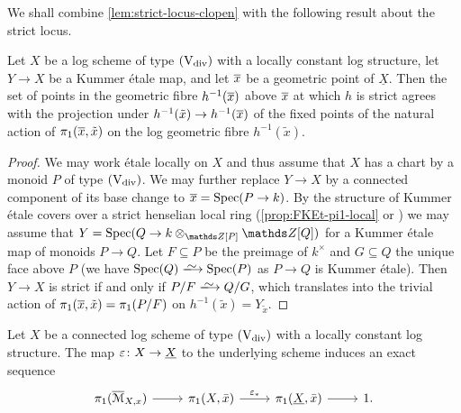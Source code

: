 We shall combine \cref{lem:strict-locus-clopen} with the following result about the strict locus.

\begin{lem} \label{lem:criterion strict}
    Let $X$ be a log scheme of type $(\mathrm{V}_{\rm div})$ with a locally constant log structure, let $Y\to X$ be a Kummer \'etale map, and let $\overline{x}$ be a geometric point of $\underline{X}$.  Then the set of points in the geometric fibre $h^{-1}(\overline{x})$ above $\overline{x}$ at which $h$ is strict agrees with the projection under $h^{-1}(\tilde{x}) \to h^{-1}(\overline{x})$ of the 
    fixed points of the natural action of $\pi_1(\overline{x},\tilde x)$ on the log geometric fibre $h^{-1}(\tilde x)$.
\end{lem}

\begin{proof}
We may work \'etale locally on $X$ and thus assume that $X$ has a chart by a monoid $P$ of type $(\mathrm{V}_{\rm div})$.
We may further replace $Y \to X$ by a connected component of its base change to $\overline{x} = \operatorname{Spec}(P\to k)$. By the structure of Kummer \'etale covers over a strict henselian local ring (\cref{prop:FKEt-pi1-local} or \cite[Lemma~4.2.7]{AHLS-Log}) we may assume that $Y = \Spec(Q\to k\otimes_{\bZ[P]}\bZ[Q])$ for a Kummer \'etale map of monoids $P \to Q$. Let $F \subseteq P$ be the preimage of $k^\times$ and $G\subseteq Q$ the unique face above $P$ (we have $\Spec(Q)\isomto\Spec(P)$ as $P\to Q$ is Kummer \'etale). Then $Y\to X$ is strict if and only if $P/F\isomto Q/G$, which translates into the trivial action of $\pi_1(\overline{x},\tilde{x}) = \pi_1(P/F)$ on $h^{-1}(\tilde x) = Y_{\tilde x}$.
\end{proof}

\begin{prop} \label{prop:torus-fibration-pi1}
    Let $X$ be a connected log scheme of type $(\mathrm{V}_{\rm div})$ with a locally constant log structure. 
    The map $\varepsilon\colon X \to \underline{X}$ to the underlying scheme induces an exact sequence
    \[
        \begin{tikzcd}
            \pi_1(\ov \cM_{X,x}) \ar[r] & \pi_1(X,\bar x) \ar[r,"\ep_\ast"] & \pi_1(\underline{X},\bar x) \ar[r] & 1.
        \end{tikzcd}
    \]
\end{prop}

